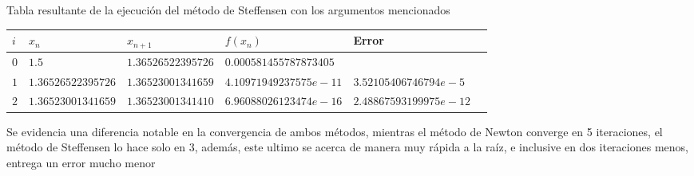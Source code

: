\documentclass[12pt]{article}
\begin{document}
Tabla resultante de la ejecución del método de Steffensen con los argumentos mencionados
\begin{center}
	\begin{tabular}{|l|l|l|l|l|l|} \hline
		$i$ & $x_n$ & $x_{n+1}$ & $f(x_n)$ & Error \\
	\hline \hline
	$0$ & $1.5$ & $1.36526522395726$ & $0.000581455787873405$ & \\ 
	\hline 
	$1$ & $1.36526522395726$ & $1.36523001341659$ & $4.10971949237575e-11$ & $3.52105406746794e-5$ \\
	\hline
	$2$ & $1.36523001341659$ & $1.36523001341410$ & $6.96088026123474e-16$  & $2.48867593199975e-12$ \\
	\hline
	\end{tabular}
\end{center}

Se evidencia una diferencia notable en la convergencia de ambos métodos, mientras
el método de Newton converge en 5 iteraciones, el método de Steffensen lo hace solo en 3, además, este ultimo se acerca de manera muy
rápida a la raíz, e inclusive en dos iteraciones menos, entrega un error mucho menor
\end{document}
